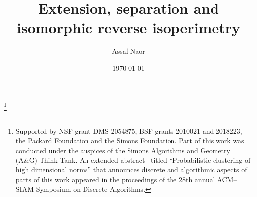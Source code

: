 \documentclass[11pt,reqno]{amsart}
\theoremstyle{remark}
\renewcommand{\1}{\mathbf 1}
\begin{document}
\title{Extension, separation and isomorphic reverse isoperimetry}



\author{Assaf Naor}
\address{Mathematics Department, Princeton University,\\ Fine Hall, Washington Road, Princeton, NJ 08544-1000, USA}
\thanks{Supported by NSF grant DMS-2054875, BSF grants  2010021 and 2018223, the Packard Foundation and the Simons Foundation. Part of this work  was conducted under the auspices of the Simons Algorithms and Geometry (A\&G) Think Tank.  An extended abstract~\cite{Nao17-SODA} titled ``Probabilistic clustering of high dimensional norms'' that announces discrete and algorithmic aspects of parts of this work   appeared in the proceedings of the 28th annual ACM--SIAM Symposium on Discrete Algorithms.}


\date{\today}
\maketitle


\end{document}
